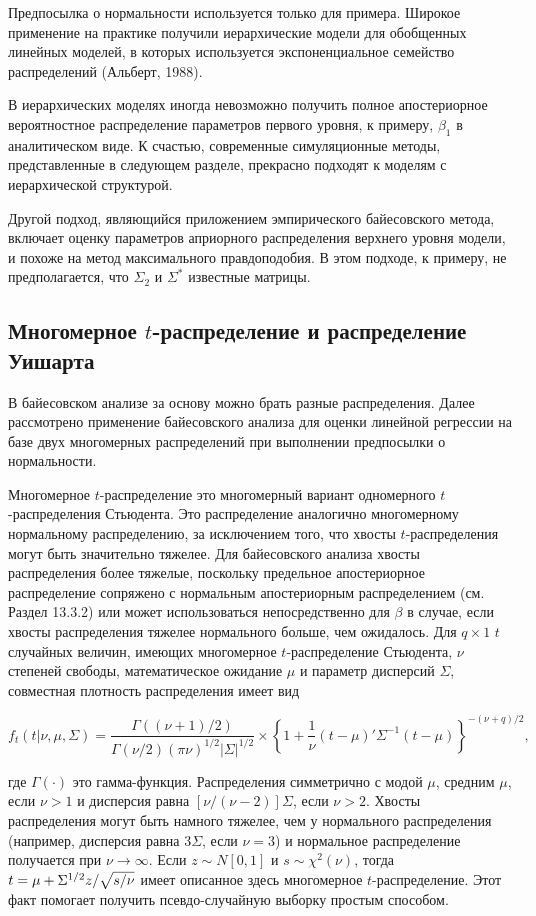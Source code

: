 Предпосылка о нормальности используется только для примера. Широкое применение на практике получили иерархические модели для обобщенных линейных моделей, в которых используется экспоненциальное семейство распределений (Альберт, 1988).

В иерархических моделях иногда невозможно получить полное апостериорное вероятностное распределение параметров первого уровня, к примеру, $\beta_1$ в аналитическом виде. К счастью, современные симуляционные методы,  представленные в следующем разделе, прекрасно подходят к моделям с иерархической структурой.

Другой подход, являющийся приложением эмпирического байесовского метода, включает оценку параметров априорного распределения верхнего уровня модели, и похоже на метод максимального правдоподобия. В этом подходе, к примеру, не предполагается, что $\Sigma_2$ и $\Sigma^*$ известные матрицы.

\subsection{Многомерное $t$-распределение и распределение Уишарта}

В байесовском анализе за основу можно брать разные распределения. Далее рассмотрено применение байесовского анализа для оценки линейной регрессии на базе двух многомерных распределений при выполнении предпосылки о нормальности.

Многомерное $t$-распределение это многомерный вариант одномерного $t$-распределения Стьюдента. Это распределение аналогично многомерному нормальному распределению, за исключением того, что хвосты $t$-распределения могут быть значительно тяжелее. Для байесовского анализа хвосты распределения более тяжелые, поскольку предельное апостериорное распределение сопряжено с нормальным апостериорным распределением (см. Раздел 13.3.2) или может использоваться непосредственно для $\beta$ в случае, если хвосты распределения тяжелее нормального больше, чем ожидалось. Для $q \times 1$ $t$ случайных величин, имеющих многомерное $t$-распределение Стьюдента, $\nu$ степеней свободы, математическое ожидание $\mu$ и параметр дисперсий $\Sigma$, совместная плотность распределения имеет вид

\[
f_t(t|\nu,\mu,\Sigma)=
\frac{\Gamma((\nu+1)/2)}{\Gamma(\nu/2)(\pi\nu)^{1/2}|\Sigma|^{1/2}} 
\times \left\lbrace 1+\frac{1}{\nu}(t-\mu)'\Sigma^{-1}(t-\mu)\right\rbrace^{-(\nu+q)/2},
\]

где $\Gamma(\cdot)$ это гамма-функция. Распределения симметрично с модой $\mu$, средним $\mu$, если $\nu>1$ и дисперсия равна $[\nu/(\nu-2)]\Sigma$, если $\nu>2$. Хвосты распределения могут быть намного тяжелее, чем у нормального распределения (например, дисперсия равна $3\Sigma$, если $\nu=3$) и нормальное распределение получается при $\nu{\rightarrow}\infty$. Если $z{\sim}N[0,1]$ и $s{\sim}\chi^2(\nu)$, тогда $t=\mu+\Sigma^{\-1/2}z/\sqrt{s/\nu}$ имеет описанное здесь многомерное $t$-распределение. Этот факт помогает получить псевдо-случайную выборку простым способом.

